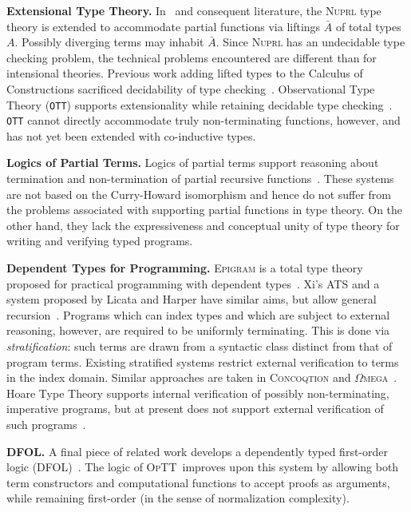 \documentclass{fundam}
\newcommand{\optt}{\textsc{OpTT}}
\begin{document}
\textbf{Extensional Type Theory.} In~\cite{constable+89} and
consequent literature, the \textsc{Nuprl} type theory is extended to
accommodate partial functions via liftings $\bar{A}$ of total types
$A$.  Possibly diverging terms may inhabit $\bar{A}$.  Since
\textsc{Nuprl} has an undecidable type checking problem, the technical
problems encountered are different than for intensional theories.
Previous work adding lifted types to the Calculus of Constructions
sacrificed decidability of type checking~\cite{audebaud91}.
Observational Type Theory (\texttt{OTT}) supports extensionality while
retaining decidable type checking~\cite{altenkirch+07}.  \texttt{OTT}
cannot directly accommodate truly non-terminating functions, however,
and has not yet been extended with co-inductive types.

\textbf{Logics of Partial Terms.} Logics of partial terms support
reasoning about termination and non-termination of partial recursive
functions~\cite{stark98,B85}.  These systems are not based on the
Curry-Howard isomorphism and hence do not suffer from the problems
associated with supporting partial functions in type theory.  On the
other hand, they lack the expressiveness and conceptual unity of type
theory for writing and verifying typed programs.

\textbf{Dependent Types for Programming.} \textsc{Epigram} is a total
type theory proposed for practical programming with dependent
types~\cite{mcbride+04}.  Xi's \textsc{ATS} and a system proposed by
Licata and Harper have similar aims, but allow general
recursion~\cite{licata+05,chenxi05}.  Programs which can index types
and which are subject to external reasoning, however, are required to
be uniformly terminating.  This is done via \emph{stratification}:
such terms are drawn from a syntactic class distinct from that of
program terms.  Existing stratified systems restrict external
verification to terms in the index domain.  Similar approaches are
taken in \textsc{Concoqtion} and
$\Omega$\textsc{mega}~\cite{pasalic+07,sheard06}.  Hoare Type Theory
supports internal verification of possibly non-terminating, imperative
programs, but at present does not support external verification of
such programs~\cite{nanevski+05}.

\textbf{DFOL.} A final piece of related work develops a dependently
typed first-order logic (DFOL)~\cite{rabe06}.  The logic of \optt\
improves upon this system by allowing both term constructors and
computational functions to accept proofs as arguments, while remaining
first-order (in the sense of normalization complexity).
\end{document}
